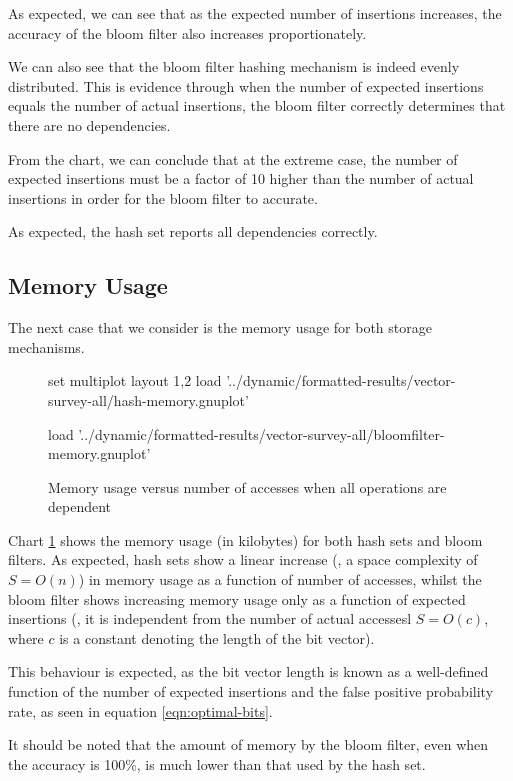 	As expected, we can see that as the expected number of insertions increases, the accuracy of the bloom filter also increases proportionately. 
	
	We can also see that the bloom filter hashing mechanism is indeed evenly distributed. This is evidence through when the number of expected insertions equals the number of actual insertions, the bloom filter correctly determines that there are no dependencies.
	
	From the chart, we can conclude that at the extreme case, the number of expected insertions must be a factor of 10 higher than the number of actual insertions in order for the bloom filter to accurate.
	
	As expected, the hash set reports all dependencies correctly.
		
	\subsection{Memory Usage} \label{sec:results/all/mem}
	The next case that we consider is the memory usage for both storage mechanisms.
	
	\begin{figure}
		\centering
		\begin{gnuplot}[terminal=pdf]
			set multiplot layout 1,2
				load '../dynamic/formatted-results/vector-survey-all/hash-memory.gnuplot'
				
				load '../dynamic/formatted-results/vector-survey-all/bloomfilter-memory.gnuplot'
		\end{gnuplot}
		\caption{Memory usage versus number of accesses when all operations are dependent}
		\label{chart:all-mem}
	\end{figure}
	
	Chart \ref{chart:all-mem} shows the memory usage (in kilobytes) for both hash sets and bloom filters. As expected, hash sets show a linear increase (\ie, a space complexity of $S=O(n)$) in memory usage as a function of number of accesses, whilst the bloom filter shows increasing memory usage only as a function of expected insertions (\ie, it is independent from the number of actual accessesl $S=O(c)$, where $c$ is a constant denoting the length of the bit vector).
	
	This behaviour is expected, as the bit vector length is known as a well-defined function of the number of expected insertions and the false positive probability rate, as seen in equation \ref{eqn:optimal-bits}.
	
	It should be noted that the amount of memory by the bloom filter, even when the accuracy is 100\%, is much lower than that used by the hash set.
	
